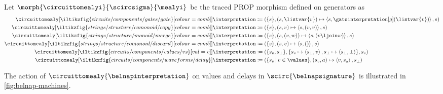 \begin{definition}
    Let \(\morph{\circuittomealyi}{\scircsigma}{\mealyi}\) be the traced PROP
    morphism defined on generators as
    \begin{align*}
        \circuittomealy[
            \iltikzfig{circuits/components/gates/gate}[colour=comb]
        ]{\interpretation}
         & \coloneqq \left(
        \{s\},
        \left(s, \listvar{v}\right) \mapsto
        \left\langle{s, \gateinterpretation[g](\listvar{v})}\right\rangle,
        s
        \right)
        \\
        \circuittomealy[
            \iltikzfig{strings/structure/comonoid/copy}[colour=comb]
        ]{\interpretation}
         & \coloneqq \left(
        \{s\},
        (s, v) \mapsto \left\langle{s, (v, v)}\right\rangle,
        s
        \right)
        \\
        \circuittomealy[
            \iltikzfig{strings/structure/monoid/merge}[colour=comb]
        ]{\interpretation}
         & \coloneqq \left(
        \{s\},
        (s, (v, w)) \mapsto
        \left\langle{s, (v \ljoin w)}\right\rangle,
        s
        \right)
        \\
        \circuittomealy[
            \iltikzfig{strings/structure/comonoid/discard}[colour=comb]
        ]{\interpretation}
         & \coloneqq \left(
        \{s\},
        (s, v) \mapsto
        \left\langle{s, ()}\right\rangle,
        s
        \right)
        \\
        \circuittomealy[
            \iltikzfig{circuits/components/values/vs}[val=v]
        ]{\interpretation}
         & \coloneqq
        \left(
        \{s_v, s_\bot\},
        \{
        s_v \mapsto \left\langle{s_\bot,v}\right\rangle,
        s_\bot \mapsto \left\langle{s_\bot,\bot}\right\rangle
        \},
        s_v
        \right)
        \\
        \circuittomealy[
            \iltikzfig{circuits/components/waveforms/delay}
        ]{\interpretation}
         & \coloneqq
        \left(
        \{ s_v \,|\, v \in \values\},
        (s_v, a) \mapsto \left\langle{v,s_a}\right\rangle,
        s_\bot
        \right)
    \end{align*}
\end{definition}

\begin{example}
    The action of \(\circuittomealy{\belnapinterpretation}\) on values and
    delays in \(\scirc{\belnapsignature}\) is illustrated in
    \cref{fig:belnap-machines}.
\end{example}

